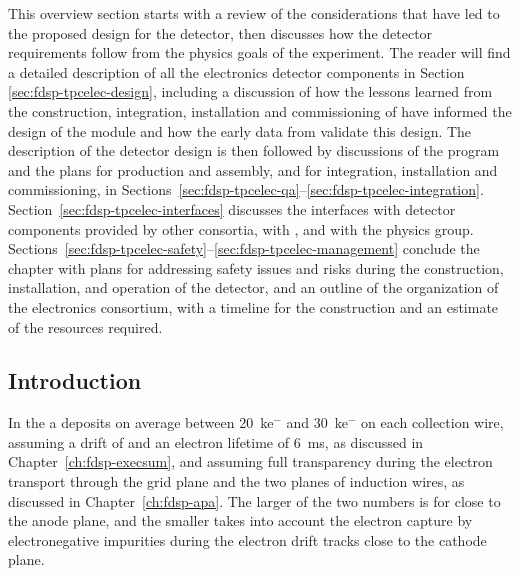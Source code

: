 This overview section starts with a review of the considerations that
have led to the proposed design for the   detector, 
then discusses how the detector requirements follow from the physics goals 
of the experiment. The reader will find a detailed description of all the 
 electronics detector components in Section \ref{sec:fdsp-tpcelec-design},
including a discussion of how the lessons learned from the construction,
integration, installation and commissioning of  have informed
the design of the   module and how the early data
from  validate this design. The description of the detector
design is then followed by discussions 
of the  program and the plans for production and assembly, 
and for integration, installation and commissioning, in 
Sections~\ref{sec:fdsp-tpcelec-qa}--\ref{sec:fdsp-tpcelec-integration}. 
Section~\ref{sec:fdsp-tpcelec-interfaces} discusses the interfaces with 
detector components provided by other consortia, with , and with the physics group. 
Sections~\ref{sec:fdsp-tpcelec-safety}--\ref{sec:fdsp-tpcelec-management} 
conclude the chapter with plans for addressing safety issues and risks during the
construction, installation, and operation of the detector, and 
an outline of the organization of the  electronics consortium, 
with a timeline for the  construction and an estimate
of the resources required.

\subsection{Introduction}
\label{sec:fdsp-tpcelec-overview-intro}

In the   a  deposits on average between
\SI{20}{k}{e$^-$} and \SI{30}{k}{e$^-$} on each collection wire, assuming a drift \efield
of \spmaxfield and an electron lifetime of \SI{6}{ms}, as discussed in
Chapter~\ref{ch:fdsp-execsum}, and assuming full transparency during the 
electron transport through the grid plane and the two planes of induction
wires, as discussed in Chapter~\ref{ch:fdsp-apa}. The larger of the two numbers 
is for  close to the anode plane, and the smaller
takes into account the electron capture by electronegative impurities during the electron
drift tracks close to the cathode plane. 

